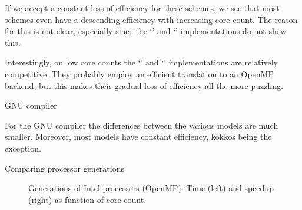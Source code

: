 If we accept a constant loss of efficiency for these schemes,
we see that most schemes even have a descending efficiency
with increasing core count.
The reason for this is not clear, especially since the
`' and `' implementations do not show this.

Interestingly, on low core counts the `' and `'
implementations are relatively competitive.
They probably employ an efficient translation to an OpenMP backend,
but this makes their gradual loss of efficiency all the more puzzling.

 {GNU compiler}

For the GNU compiler the differences between the various models
are much smaller.
Moreover, most models have constant efficiency, kokkos being the exception.

 {Comparing processor generations}



\begin{figure*}[t]
  \pgfplotsset{table/col sep=comma}
  \hbox\bgroup %
  \egroup %
  \caption{Generations of Intel processors (OpenMP). Time (left) and speedup (right) as function of core count.}
  \label{fig:diff2d-procs}
\end{figure*}

